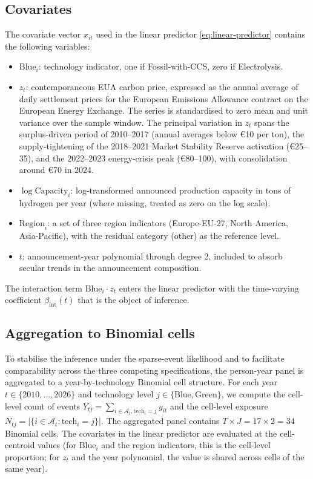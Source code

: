 \documentclass[12pt,a4paper]{article}
\newcommand{\bint}{\beta_{\text{int}}}
\theoremstyle{plain}
\theoremstyle{definition}
\begin{document}
\subsection{Covariates}

The covariate vector $x_{it}$ used in the linear predictor \eqref{eq:linear-predictor} contains the following variables:
\begin{itemize}
\item $\text{Blue}_i$: technology indicator, one if Fossil-with-CCS, zero if Electrolysis.
\item $z_t$: contemporaneous EUA carbon price, expressed as the annual average of daily settlement prices for the European Emissions Allowance contract on the European Energy Exchange. The series is standardised to zero mean and unit variance over the sample window. The principal variation in $z_t$ spans the surplus-driven period of 2010--2017 (annual averages below \euro 10 per ton), the supply-tightening of the 2018--2021 Market Stability Reserve activation (\euro 25--35), and the 2022--2023 energy-crisis peak (\euro 80--100), with consolidation around \euro 70 in 2024.
\item $\log\text{Capacity}_i$: log-transformed announced production capacity in tons of hydrogen per year (where missing, treated as zero on the log scale).
\item $\text{Region}_i$: a set of three region indicators (Europe-EU-27, North America, Asia-Pacific), with the residual category (other) as the reference level.
\item $t$: announcement-year polynomial through degree 2, included to absorb secular trends in the announcement composition.
\end{itemize}
The interaction term $\text{Blue}_i \cdot z_t$ enters the linear predictor with the time-varying coefficient $\bint(t)$ that is the object of inference.

\subsection{Aggregation to Binomial cells}

To stabilise the inference under the sparse-event likelihood and to facilitate comparability across the three competing specifications, the person-year panel is aggregated to a year-by-technology Binomial cell structure. For each year $t \in \{2010, \ldots, 2026\}$ and technology level $j \in \{\text{Blue}, \text{Green}\}$, we compute the cell-level count of events $Y_{tj} = \sum_{i \in \mathcal{A}_t, \text{tech}_i = j} y_{it}$ and the cell-level exposure $N_{tj} = |\{i \in \mathcal{A}_t : \text{tech}_i = j\}|$. The aggregated panel contains $T \times J = 17 \times 2 = 34$ Binomial cells. The covariates in the linear predictor are evaluated at the cell-centroid values (for $\text{Blue}_i$ and the region indicators, this is the cell-level proportion; for $z_t$ and the year polynomial, the value is shared across cells of the same year).
\end{document}
